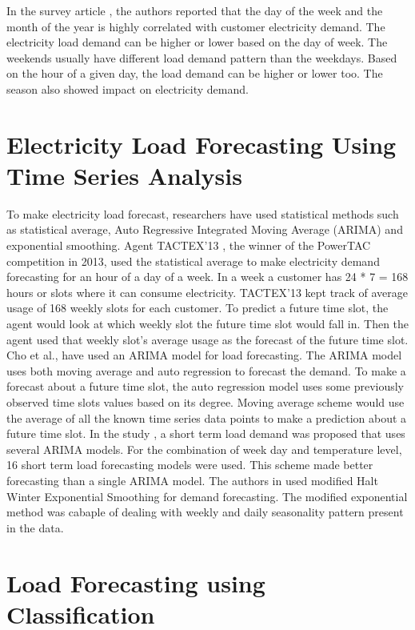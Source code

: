 In the survey article \cite{hahn2009electric}, the authors reported that the day of the week and the month of the year is highly correlated with customer electricity demand. The electricity load demand can be higher or lower based on the day of week. The weekends usually have different load demand pattern than the weekdays. Based on the hour of a given day, the load demand can be higher or lower too. The season also showed impact on electricity demand. 

\section{Electricity Load Forecasting Using Time Series Analysis}

To make electricity load forecast, researchers have used statistical methods such as statistical average, Auto Regressive Integrated Moving Average (ARIMA) and exponential smoothing.  Agent TACTEX'13 \cite{urieli2014tactex}, the winner of the PowerTAC competition in 2013, used the statistical average to make electricity demand forecasting for an hour of a day of a week. In a week a customer has 24 * 7 = 168 hours or slots where it can consume electricity. TACTEX'13  kept track of average usage of 168 weekly slots for each customer. To predict a future time slot, the agent would look at which weekly slot the future time slot would fall in. Then the agent used that weekly slot's average usage as the forecast of the future time slot. Cho et al., \cite{cho1995customer} have used an ARIMA model for load forecasting. The ARIMA model uses both moving average and auto regression to forecast the demand. To make a forecast about a future time slot, the auto regression model uses some previously observed time slots values based on its degree. Moving average scheme would use the average of all the known time series data points to make a prediction about a future time slot. In the study \cite{amjady2001short}, a short term load demand was proposed that uses several ARIMA models. For the combination of week day and temperature level, 16 short term load forecasting models were used. This scheme made better forecasting than a single ARIMA model. The authors in \cite{jalil2013electricity} used modified Halt Winter Exponential Smoothing for demand forecasting. The modified exponential method was cabaple of dealing with weekly and daily seasonality pattern present in the data.    


\section{Load Forecasting using Classification}

